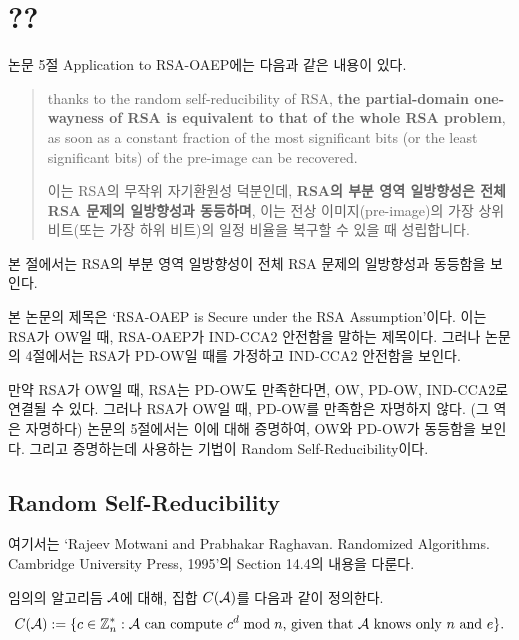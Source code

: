 \section{??}

논문 5절 Application to RSA-OAEP에는 다음과 같은 내용이 있다.

\begin{quote}
    \noindent
    thanks to the random self-reducibility of RSA, \textbf{the partial-domain
    one-wayness of RSA is equivalent to that of the whole RSA problem}, as soon
    as a constant fraction of the most significant bits (or the least
    significant bits) of the pre-image can be recovered.
    
    이는 RSA의 무작위 자기환원성 덕분인데, \textbf{RSA의 부분 영역 일방향성은
    전체 RSA 문제의 일방향성과 동등하며}, 이는 전상 이미지(pre-image)의 가장
    상위 비트(또는 가장 하위 비트)의 일정 비율을 복구할 수 있을 때 성립합니다.
\end{quote}

본 절에서는 RSA의 부분 영역 일방향성이 전체 RSA 문제의 일방향성과 동등함을 보인다.

\begin{memo}
    본 논문의 제목은 `RSA-OAEP is Secure under the RSA Assumption'이다. 이는
    RSA가 OW일 때, RSA-OAEP가 IND-CCA2 안전함을 말하는 제목이다. 그러나 논문의
    4절에서는 RSA가 PD-OW일 때를 가정하고 IND-CCA2 안전함을 보인다.

    만약 RSA가 OW일 때, RSA는 PD-OW도 만족한다면, OW, PD-OW, IND-CCA2로
    연결될 수 있다. 그러나 RSA가 OW일 때, PD-OW를 만족함은 자명하지 않다. (그
    역은 자명하다) 논문의 5절에서는 이에 대해 증명하여, OW와 PD-OW가 동등함을
    보인다. 그리고 증명하는데 사용하는 기법이 Random Self-Reducibility이다.
\end{memo}

\subsection{Random Self-Reducibility}

\begin{tcolorbox}
    여기서는 `Rajeev Motwani and Prabhakar Raghavan. Randomized Algorithms.
    Cambridge University Press, 1995'의 Section 14.4의 내용을 다룬다.
\end{tcolorbox}

임의의 알고리듬 $\mathcal{A}$에 대해, 집합 $C(\mathcal{A})$를 다음과 같이 정의한다.
$$
    C(\mathcal{A}) := \{ c \in \mathbb{Z}_n^* : \mathcal{A} \text{ can compute $c^d \bmod n$, given that $\mathcal{A}$ knows only $n$ and $e$} \}.
$$


